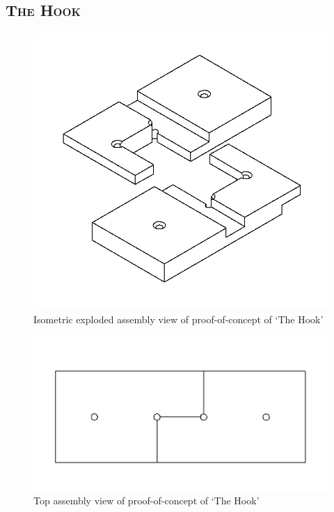 \documentclass[12pt]{article}
\begin{document}
\subsection{\textsc{The Hook} }

\begin{figure}[h!]
  \centering
  	\includegraphics[width=\textwidth]{Hook_iso}
  \caption{Isometric exploded assembly view of proof-of-concept of `The Hook'}
  \label{fig:hook_iso}
\end{figure}

\begin{figure}[h!]
  \centering
  	\includegraphics[width=\textwidth]{Hook_top}
  \caption{Top assembly view of proof-of-concept of `The Hook'}
  \label{fig:hook_top}
\end{figure}
\end{document}
